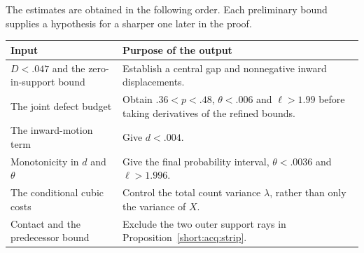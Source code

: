The estimates are obtained in the following order. Each preliminary
bound supplies a hypothesis for a sharper one later in the proof.
\begin{center}\small
\begin{tabular}{@{}p{.27\linewidth}p{.65\linewidth}@{}}
\toprule
Input & Purpose of the output \\
\midrule
$D<.047$ and the zero-in-support bound & Establish a central gap and
nonnegative inward displacements. \\
The joint defect budget & Obtain $.36<p<.48$, $\theta<.006$ and
$\ell>1.99$ before taking derivatives of the refined bounds. \\
The inward-motion term & Give $d<.004$. \\
Monotonicity in $d$ and $\theta$ & Give the final probability interval,
$\theta<.0036$ and $\ell>1.996$. \\
The conditional cubic costs & Control the total count variance
$\lambda$, rather than only the variance of $X$. \\
Contact and the predecessor bound & Exclude the two outer support rays
in Proposition~\ref{short:acq:strip}. \\
\bottomrule
\end{tabular}
\end{center}

